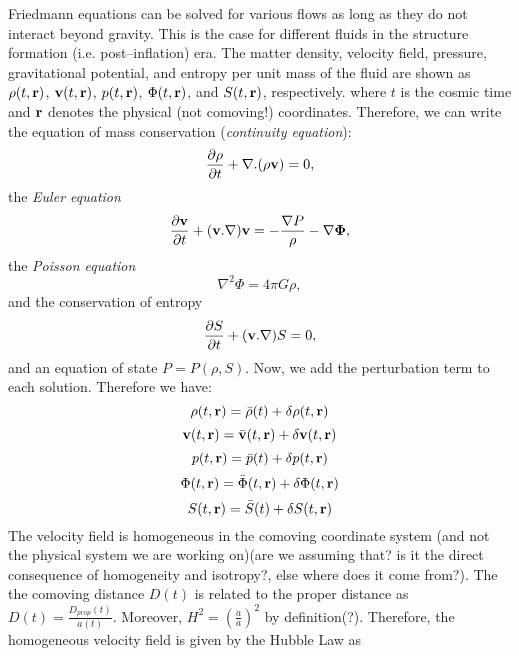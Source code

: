 \documentclass[paper=a4, fontsize=11pt]{scrartcl} %
\numberwithin{equation}{section} %
\numberwithin{figure}{section} %
\numberwithin{table}{section} %
\begin{document}
Friedmann equations can be solved for various flows as long as they do not interact beyond gravity. This is the case for different fluids in the structure formation (i.e. post--inflation) era. The matter density, velocity field, pressure, gravitational potential, and entropy per unit mass of the fluid are shown as $\rho(t, {\bf r})$, ${\bf v}(t, {\bf r})$, $p(t, {\bf r})$, $\Phi(t, {\bf r})$, and $S(t, {\bf r})$, respectively. where $t$ is the cosmic time and ${\bf r}$ denotes the physical (not comoving!) coordinates. 
Therefore, we can write the equation of mass conservation (\emph{continuity equation}):
\begin{equation}
\label{continuity}
\frac{\partial \rho}{\partial t} + {\bf \nabla}.(\rho {\bf v}) = 0,
\end{equation}
the \emph{Euler equation}
\begin{equation}
\label{Euler}
\frac{\partial {\bf v}}{\partial t} + {\bf (v .\nabla) v} = -\frac{{\bf \nabla} P}{\rho} - {\bf \nabla \Phi},
\end{equation}
the \emph{Poisson equation}
\begin{equation}
\label{Poisson}
\nabla ^2 \Phi = 4\pi G \rho,
\end{equation}
and the conservation of entropy
\begin{equation}
\label{entropy}
\frac{\partial S}{\partial t} + {\bf (v .\nabla)}S = 0,
\end{equation}
and an equation of state $P = P(\rho, S)$.
Now, we add the perturbation term to each solution. Therefore we have:
\begin{equation}
\rho(t, {\bf r}) = \bar{\rho}(t) + \delta\rho(t, {\bf r})\nonumber
\end{equation}
\begin{equation}
{\bf v}(t, {\bf r}) = \bar{{\bf v}}(t, {\bf r}) + \delta{\bf v}(t, {\bf r})\nonumber 
\end{equation}
\begin{equation}
p(t, {\bf r}) = \bar{p}(t) + \delta p(t, {\bf r})\nonumber 
\end{equation}
\begin{equation}
\Phi(t, {\bf r}) = \bar{\Phi}(t, {\bf r}) + \delta\Phi(t, {\bf r})\nonumber 
\end{equation}
\begin{equation}
S(t, {\bf r}) = \bar{S}(t) + \delta S(t, {\bf r})\nonumber 
\end{equation}
The velocity field is homogeneous in the comoving coordinate system (and not the physical system we are working on)(are we assuming that? is it the direct consequence of homogeneity and isotropy?, else where does it come from?). The the comoving distance $D(t)$ is related to the proper distance as $D(t) = \frac{D_{prop}(t)}{a(t)}$. Moreover, $H^2 = (\frac{\dot{a}}{a})^2$ by definition(?). Therefore, the homogeneous velocity field is given by the Hubble Law as
\end{document}
